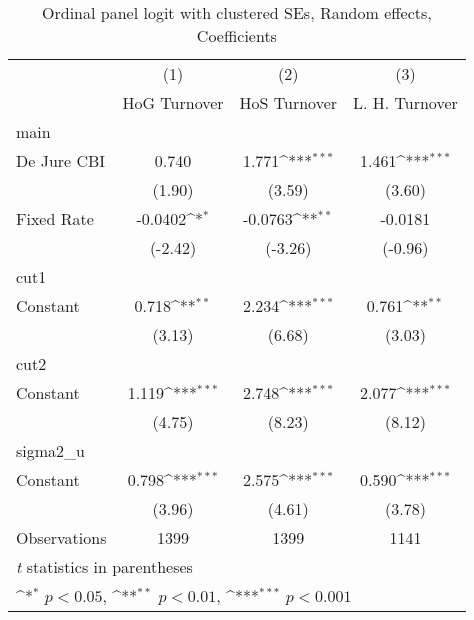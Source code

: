 \begin{table}[htbp]\centering
\def\sym#1{\ifmmode^{#1}\else\(^{#1}\)\fi}
\caption{Ordinal panel logit with clustered SEs, Random effects, Coefficients \label{coeffordLogDJ}}
\begin{tabular}{l*{3}{c}}
\toprule
                                        &\multicolumn{1}{c}{(1)}&\multicolumn{1}{c}{(2)}&\multicolumn{1}{c}{(3)}\\
                                        &\multicolumn{1}{c}{HoG Turnover}&\multicolumn{1}{c}{HoS Turnover}&\multicolumn{1}{c}{L. H. Turnover}\\
\midrule
main                                    &                  &                  &                  \\
De Jure CBI                             &    0.740         &    1.771\sym{***}&    1.461\sym{***}\\
                                        &   (1.90)         &   (3.59)         &   (3.60)         \\
\addlinespace
Fixed Rate                              &  -0.0402\sym{*}  &  -0.0763\sym{**} &  -0.0181         \\
                                        &  (-2.42)         &  (-3.26)         &  (-0.96)         \\
\midrule
cut1                                    &                  &                  &                  \\
Constant                                &    0.718\sym{**} &    2.234\sym{***}&    0.761\sym{**} \\
                                        &   (3.13)         &   (6.68)         &   (3.03)         \\
\midrule
cut2                                    &                  &                  &                  \\
Constant                                &    1.119\sym{***}&    2.748\sym{***}&    2.077\sym{***}\\
                                        &   (4.75)         &   (8.23)         &   (8.12)         \\
\midrule
sigma2\_u                                &                  &                  &                  \\
Constant                                &    0.798\sym{***}&    2.575\sym{***}&    0.590\sym{***}\\
                                        &   (3.96)         &   (4.61)         &   (3.78)         \\
\midrule
Observations                            &     1399         &     1399         &     1141         \\
\bottomrule
\multicolumn{4}{l}{\footnotesize \textit{t} statistics in parentheses}\\
\multicolumn{4}{l}{\footnotesize \sym{*} \(p<0.05\), \sym{**} \(p<0.01\), \sym{***} \(p<0.001\)}\\
\end{tabular}
\end{table}
